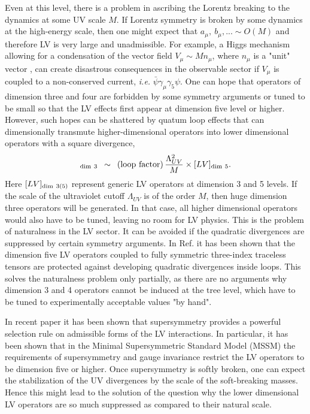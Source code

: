 \documentclass[12pt]{revtex4}
\begin{document}
Even at this level, there is a problem in ascribing the Lorentz breaking 
to the dynamics at some UV scale $M$. If Lorentz symmetry is broken by 
some dynamics at the high-energy scale, then one might expect that $a_\mu,~b_\mu,... \sim O(M)$
and therefore LV is very large and unadmissible. For example, a Higgs mechanism 
allowing for a condensation of the vector field $V_{\mu}\sim M n_\mu$, where $n_\mu$ is a 
"unit" vector \cite{Kostelecky:1989jw}, can create disastrous consequences in the observable sector if 
$V_\mu$ is coupled to a non-conserved current, {\em i.e.} $\bar \psi \gamma_\mu\gamma_5 \psi$.  
One can hope that operators of dimension three and four are forbidden by 
some symmetry arguments or tuned to be small so that the LV effects 
first appear at dimension five level \cite{MP:} 
or higher. However, such hopes can be shattered by quatum loop effects that 
can dimensionally transmute higher-dimensional operators into lower dimensional operators
with a square divergence,
\begin{equation}
[LV]_{\rm dim~3} \,~\sim~\, ({\rm loop~factor}) \, 
\frac{\Lambda_{UV}^2}{M} 
\times [LV]_{{\rm dim}~5}. 
\label{transmute}
\end{equation}
Here $[LV]_{\rm dim~3(5)}$ represent generic LV operators at dimension
3 and 5 levels. If the scale of the ultraviolet cutoff $\Lambda_{UV}$
is of the order $M$, then huge dimension three operators will be
generated. In that case, all higher dimensional operators would also 
have to be tuned, leaving no room for LV physics. This is the problem
of naturalness in the LV sector. It can be avoided if the quadratic
divergences are suppressed by certain symmetry arguments. In
Ref. \cite{MP:} it has been shown that the dimension five LV operators
coupled to fully symmetric three-index traceless tensors are protected
against developing quadratic divergences inside loops. This solves the
naturalness problem only partially, as there are no arguments why
dimension 3 and 4 operators cannot be induced at the tree level, which
have to be tuned to experimentally acceptable values  "by hand".  

In recent paper \cite{GrootNibbelink:2004za} it has been shown that
supersymmetry provides a powerful selection  rule on admissible forms
of the LV interactions. In particular, it has been shown that  in the
Minimal Supersymmetric Standard Model (MSSM) the requirements of
supersymmetry and gauge invariance restrict the LV operators to be
dimension five or higher. Once supersymmetry is softly broken, one
can expect the stabilization of the UV divergences by the scale of the
soft-breaking masses. Hence this might lead to the solution of the question
why the lower dimensional LV operators are so much suppressed as
compared to their natural scale. 
\end{document}
